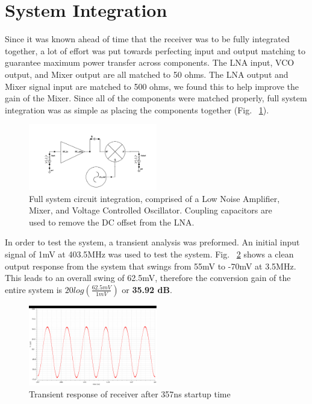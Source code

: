 \section{System Integration}
Since it was known ahead of time that the receiver was to be fully integrated together, a lot of effort was put towards perfecting input and output matching to guarantee maximum power transfer across components. The LNA input, VCO output, and Mixer output are all matched to 50 ohms. The LNA output and Mixer signal input are matched to 500 ohms, we found this to help improve the gain of the Mixer. Since all of the components were matched properly, full system integration was as simple as placing the components together (Fig. ~\ref{fig:fullsystem}). 

\begin{figure}[h]
   \centering
    \includegraphics[width=0.5\textwidth]{figures/FullSystem.png}
    \caption{ Full system circuit integration, comprised of a Low Noise Amplifier, Mixer, and Voltage Controlled Oscillator. Coupling capacitors are used to remove the DC offset from the LNA.  }
    \label{fig:fullsystem}
\end{figure}

In order to test the system, a transient analysis was preformed. An initial input signal of 1mV at 403.5MHz was used to test the system. Fig. ~\ref{fig:fullsystemtrans} shows a clean output response from the system that swings from 55mV to -70mV at 3.5MHz. This leads to an overall swing of 62.5mV, therefore the conversion gain of the entire system is $20log(\frac{62.5mV}{1mV})$ or {\bf 35.92 dB}.

\begin{figure}[h]
   \centering
    \includegraphics[width=0.5\textwidth]{figures/FullSystemTrans}
    \caption{ Transient response of receiver after 357ns startup time }
    \label{fig:fullsystemtrans}
\end{figure}

